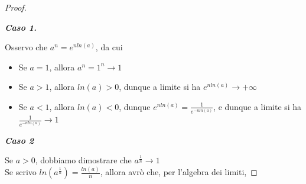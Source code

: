 \documentclass{article}
\theoremstyle{definition}
\begin{document}
\begin{proof}
    \begin{center}
        \textbf{\textit{Caso 1.}}
    \end{center}
Osservo che $a^n=e^{nln(a)}$, da cui
\begin{itemize}
    \item Se $a=1$, allora $a^n=1^n \longrightarrow 1$
    \item Se $a >1$, allora $ln(a)>0$, dunque a limite si ha $e^{nln(a)} \to +\infty$
    \item Se $a<1$, allora $ln(a) <0$, dunque $e^{nln(a)}=\frac{1}{e^{-nln(a)}}$, e dunque a limite si ha $\frac{1}{e^{-nln(a)}} \longrightarrow 1$
\end{itemize}
\begin{center}
    \textbf{\textit{Caso 2}}
\end{center}
Se $a>0$, dobbiamo dimostrare che $a^{\frac{1}{n}}\longrightarrow1$
\\
Se scrivo $ln(a^{\frac{1}{n}})=\frac{ln(a)}{n}$, allora avrò che, per l'algebra dei limiti,


\end{proof}
\end{document}
